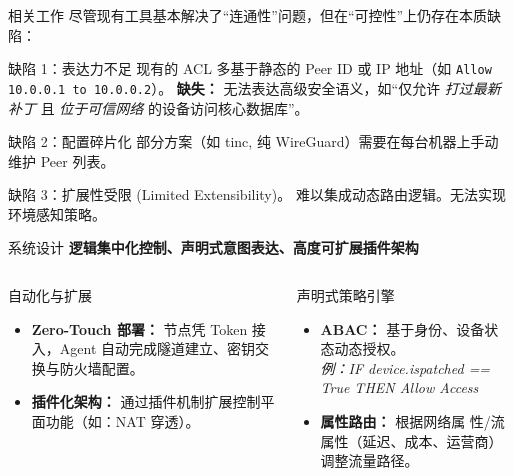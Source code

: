 \documentclass[aspectratio=169, 10pt]{beamer}
\begin{document}
\begin{frame}{相关工作}
    尽管现有工具基本解决了“连通性”问题，但在“可控性”上仍存在本质缺陷：

    \begin{exampleblock}{缺陷 1：表达力不足}
        现有的 ACL 多基于静态的 Peer ID 或 IP 地址（如 \texttt{Allow 10.0.0.1 to 10.0.0.2}）。
        \textbf{缺失：} 无法表达高级安全语义，如“仅允许 \textit{打过最新补丁} 且 \textit{位于可信网络} 的设备访问核心数据库”。
    \end{exampleblock}

    \begin{exampleblock}{缺陷 2：配置碎片化}
        部分方案（如 tinc, 纯 WireGuard）需要在每台机器上手动维护 Peer 列表。
    \end{exampleblock}

    \begin{exampleblock}{缺陷 3：扩展性受限 (Limited Extensibility)。}
        难以集成动态路由逻辑。无法实现环境感知策略。
    \end{exampleblock}
\end{frame}

\begin{frame}{系统设计}
    \textbf{逻辑集中化控制、声明式意图表达、高度可扩展插件架构}

    \begin{columns}[T]
        \begin{block}{自动化与扩展}
            \begin{itemize}
                \item \textbf{Zero-Touch 部署：} 节点凭 Token 接入，Agent 自动完成隧道建立、密钥交换与防火墙配置。
                \item \textbf{插件化架构：} 通过插件机制扩展控制平面功能（如：NAT 穿透）。
            \end{itemize}
        \end{block}

        \begin{block}{声明式策略引擎}
            \begin{itemize}
                \item \textbf{ABAC：} 基于身份、设备状态动态授权。
                    \cite{NISTABAC}\\
                \textit{\footnotesize 例：IF device.ispatched == True THEN Allow Access}
                \item \textbf{属性路由：} 根据网络属
                    性/流属性（延迟、成本、运营商）调整流量路径。
            \end{itemize}
        \end{block}

    \end{columns}
\end{frame}
\end{document}
